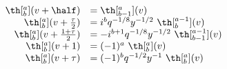 \begin{equation}
  \begin{array}{rl}
  \th[^a_b](v+\half) &=  \th[^a_{b-1}](v) \\
\th[^a_b](v+{\tau\over 2}) &=  i^b q^{-1/8} y^{-1/2}~\th[^{a-1}_b](v) \\
\th[^a_b](v+{1+\tau\over 2}) &= -i^{b+1} q^{-1/8} y^{-1/2}~\th[^{a-1}_{b-1}](v)\\
  \th[^a_b](v+1) &= (-1)^a ~\th[^a_b](v) \\
\th[^a_b](v+\tau) &=  (-1)^b q^{-1/2} y^{-1}~\th[^a_b](v)
  \end{array}
\end{equation}


